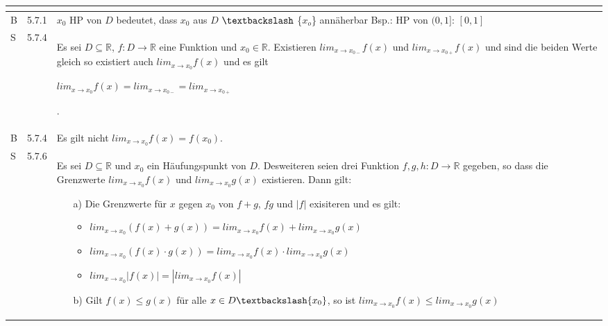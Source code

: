 \begin{longtable}{p{0.75cm} p{1cm} p{16cm}}
\begin{itemize}[topsep=-0.5cm]
                        \end{itemize} \vspace{-0cm} \\
        \midrule
        B   & 5.7.1 &   $x_0$ HP von $D$ bedeutet, dass $x_0$ aus $D$ $\textbackslash$ \{$x_o$\} annäherbar \hfill \break
                        Bsp.: HP von $(0,1]$: $[0,1]$ \\
        \midrule
        S   & 5.7.4 &   Es sei $D \subseteq \mathbb{R}$, $f: D \rightarrow \mathbb{R}$ eine Funktion und $x_0 \in \mathbb{R}$. 
                        Existieren $lim_{x \rightarrow x_{0-}}f(x)$ und $lim_{x \rightarrow x_{0+}}f(x)$ und sind die beiden Werte gleich
                        so existiert auch $lim_{x \rightarrow x_0} f(x)$ und es gilt \hfill \break
                        \centerline{$lim_{x \rightarrow x_0} f(x) = lim_{x \rightarrow x_{0-}} = lim_{x \rightarrow x_{0+}}$}.  \\
        \midrule
        B   & 5.7.4 &   Es gilt nicht $lim_{x \rightarrow x_0}f(x) = f(x_0)$. \\
        \midrule
        S   & 5.7.6 &   Es sei $D \subseteq \mathbb{R}$ und $x_0$ ein Häufungspunkt von $D$. Desweiteren seien drei Funktion $f,g,h:
                        D \rightarrow \mathbb{R}$ gegeben, so dass die Grenzwerte $lim_{x \rightarrow x_0} f(x)$ und
                        $lim_{x \rightarrow x_0} g(x)$ existieren. Dann gilt:
                        \begin{itemize}[topsep=-0.5cm]
                            \item[a)] Die Grenzwerte für $x$ gegen $x_0$ von $f+g$, $fg$ und $|f|$ exisiteren und es gilt:
                                \begin{itemize}[topsep=-0.5cm]
                                    \item $lim_{x \rightarrow x_0} (f(x) + g(x)) = lim_{x \rightarrow x_0} f(x) + lim_{x \rightarrow x_0} g(x)$
                                    \item $lim_{x \rightarrow x_0} (f(x) \cdot g(x)) = lim_{x \rightarrow x_0} f(x) \cdot lim_{x \rightarrow x_0} g(x)$
                                    \item $lim_{x \rightarrow x_0} |f(x)| = |lim_{x \rightarrow x_0} f(x)|$
                                \end{itemize}
                            \item[b)] Gilt $f(x) \leq g(x)$ für alle $x \in D \textbackslash \{x_0\}$, so ist $lim_{x \rightarrow x_0} f(x)
                                        \leq lim_{x \rightarrow x_0}g(x)$

\end{itemize}
\end{longtable}

